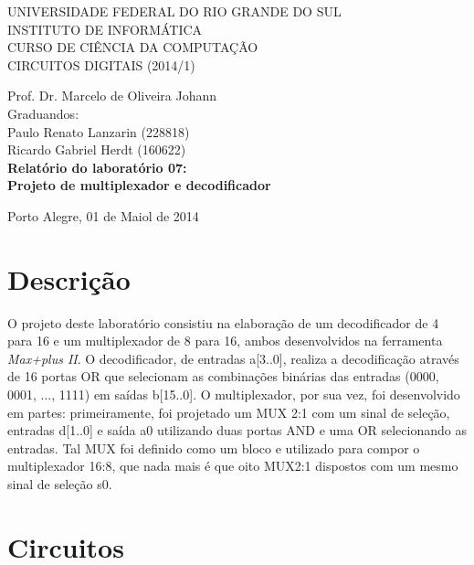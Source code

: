 \documentclass[a4paper]{article}
\begin{document}
\begin{titlepage}
\begin{center}


\large{ 
\uppercase{ Universidade Federal do Rio Grande do Sul\\

Instituto de Informática \\

Curso de Ciência da Computação \\

Circuitos Digitais (2014/1)\\
}

Prof. Dr. Marcelo de Oliveira Johann \\

Graduandos: \\ Paulo Renato Lanzarin (228818)
			\\ Ricardo Gabriel Herdt (160622) \\ [4.5cm]


\LARGE {\bfseries Relatório do laboratório 07: \\
	Projeto de multiplexador e decodificador\\[1.0cm]
}}


\vfill

Porto Alegre, 01 de Maiol de 2014

\end{center}
\end{titlepage}
\section{Descrição}

	O projeto deste laboratório consistiu na elaboração de um decodificador
de 4 para 16 e um multiplexador de 8 para 16, ambos desenvolvidos na ferramenta
\emph{Max+plus II}. O decodificador, de entradas a[3..0], realiza a
decodificação através de 16 portas OR que selecionam  as combinações binárias
das entradas (0000, 0001, ..., 1111) em saídas b[15..0]. O multiplexador, por
sua vez, foi desenvolvido em partes: primeiramente, foi projetado um MUX 2:1
com um sinal de seleção, entradas d[1..0] e saída a0 utilizando duas portas AND
e uma OR selecionando as entradas. Tal MUX foi definido como um bloco e
utilizado para compor o multiplexador 16:8, que nada mais é que oito MUX2:1
dispostos com um mesmo sinal de seleção s0.



\FloatBarrier

\section{Circuitos}
\end{document}
